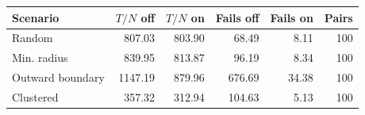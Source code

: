 \begin{tabular}{lrrrrr}
\toprule
Scenario & $T/N$ off & $T/N$ on & Fails off & Fails on & Pairs \\
\midrule
Random & 807.03 & 803.90 & 68.49 & 8.11 & 100 \\
Min. radius & 839.95 & 813.87 & 96.19 & 8.34 & 100 \\
Outward boundary & 1147.19 & 879.96 & 676.69 & 34.38 & 100 \\
Clustered & 357.32 & 312.94 & 104.63 & 5.13 & 100 \\
\bottomrule
\end{tabular}
